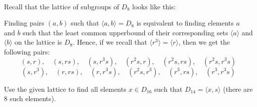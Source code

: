 \begin{solution}
    \\ Recall that the lattice of subgroups of $D_8$ looks like this:

    \begin{center}
    \end{center}
    Finding pairs $(a,b)$ such that $\langle a,b \rangle = D_8$ is equivalent to finding elements $a$ and $b$ such that the least common upperbound of their corresponding sets $\langle a \rangle$ and $\langle b \rangle$ on the lattice is $D_8$. Hence, if we recall that $\langle r^3 \rangle = \langle r \rangle$, then we get the following pairs:
    $$(s,r), \quad (s, rs), \quad (s,r^3s), \quad (r^2s,r), \quad (r^2s, rs), \quad (r^2s,r^3s)$$
    $$(s,r^3), \quad (r, rs), \quad (r,r^3s), \quad (r^2s,r^3), \quad (r^3, rs), \quad (r^3,r^3s)$$
    \break
\end{solution}

\begin{exercise}
    Use the given lattice to find all elements $x \in D_{16}$ such that $D_{14} = \langle x, s \rangle$ (there are 8 such elements). \\
\end{exercise}

